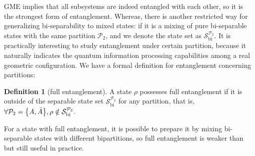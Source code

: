 \documentclass[
aps,
pra,
twocolumn,
floatfix,
]{revtex4-2}
\theoremstyle{plain}
\theoremstyle{definition}
\newtheorem{definition}{Definition}
\newtheorem{remark}{Remark}
\newcommand{\dm}{\rho}
\newcommand{\bi}{\text{bi}}
\newcommand{\separableset}{\mathcal{S}}
\newcommand{\ppartition}{\mathcal{P}}
\begin{document}
GME implies that all subsystems are indeed entangled with each other,
so it is the strongest form of entanglement. 
Whereas, there is another restricted way for generalizing bi-separability to mixed states: 
if it is a mixing of pure bi-separable states with the same partition $\ppartition_2$, 
and we denote the state set as $\separableset_{\bi}^{\ppartition_2}$. 
It is practically interesting to study entanglement under certain partition,
because it naturally indicates the quantum information processing capabilities among a real geometric configuration.
We have a formal definition for entanglement concerning partitions:
\begin{definition}[full entanglement]\label{def:full_entanglement}
	A state $\dm$ possesses full entanglement
	if it is outside of the separable state set $\separableset_{\bi}^{\ppartition_2}$ for any partition,
	that is, $\forall \ppartition_2 = \qty{A,\bar{A}},\dm \notin \separableset_\bi^{\ppartition_2}$.
\end{definition}
For a state with full entanglement, it is possible to prepare it by mixing bi-separable states with different bipartitions,
so full entanglement is weaker than  but still useful in practice.


\end{document}
